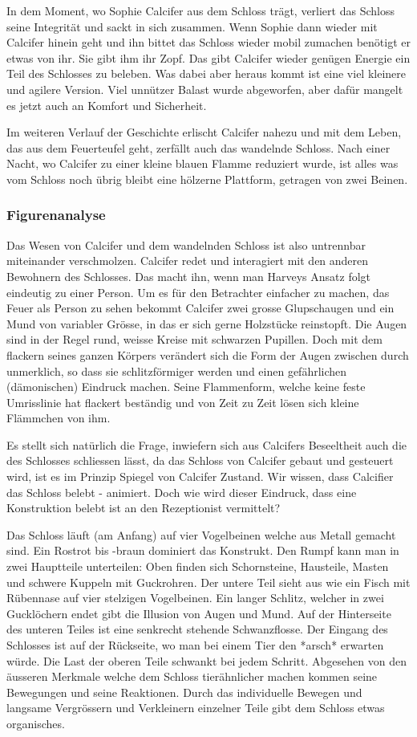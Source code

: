 In dem Moment, wo Sophie Calcifer aus dem Schloss trägt, verliert das Schloss seine Integrität und sackt in sich zusammen. Wenn Sophie dann wieder mit Calcifer hinein geht und ihn bittet das Schloss wieder mobil zumachen benötigt er etwas von ihr. Sie gibt ihm ihr Zopf. Das gibt Calcifer wieder genügen Energie ein Teil des Schlosses zu beleben. Was dabei aber heraus kommt ist eine viel kleinere und agilere Version. Viel unnützer Balast wurde abgeworfen, aber dafür mangelt es jetzt auch an Komfort und Sicherheit. 

Im weiteren Verlauf der Geschichte erlischt Calcifer nahezu und mit dem Leben, das aus dem Feuerteufel geht, zerfällt auch das wandelnde Schloss. Nach einer Nacht, wo Calcifer zu einer kleine blauen Flamme reduziert wurde, ist alles was vom Schloss noch übrig bleibt eine hölzerne Plattform, getragen von zwei Beinen. 

\subsubsection*{Figurenanalyse}
Das Wesen von Calcifer und dem wandelnden Schloss ist also untrennbar miteinander verschmolzen. Calcifer redet und interagiert mit den anderen Bewohnern des Schlosses. Das macht ihn, wenn man Harveys Ansatz folgt eindeutig zu einer Person. Um es für den Betrachter einfacher zu machen, das Feuer als Person zu sehen bekommt Calcifer zwei grosse Glupschaugen und ein Mund von variabler Grösse, in das er sich gerne Holzstücke reinstopft. Die Augen sind in der Regel rund, weisse Kreise mit schwarzen Pupillen. Doch mit dem flackern seines ganzen Körpers verändert sich die Form der Augen zwischen durch unmerklich, so dass sie schlitzförmiger werden und einen gefährlichen (dämonischen) Eindruck machen. Seine Flammenform, welche keine feste Umrisslinie hat flackert beständig und von Zeit zu Zeit lösen sich kleine Flämmchen von ihm. 

Es stellt sich natürlich die Frage, inwiefern sich aus Calcifers Beseeltheit auch die des Schlosses schliessen lässt, da das Schloss von Calcifer gebaut und gesteuert wird, ist es im Prinzip Spiegel von Calcifer Zustand. Wir wissen, dass Calcifier das Schloss belebt - animiert. Doch wie wird dieser Eindruck, dass eine Konstruktion belebt ist an den Rezeptionist vermittelt?

Das Schloss läuft (am Anfang) auf vier Vogelbeinen welche aus Metall gemacht sind. Ein Rostrot bis -braun dominiert das Konstrukt. Den Rumpf kann man in zwei Hauptteile unterteilen: Oben finden sich Schornsteine, Hausteile, Masten und schwere Kuppeln mit Guckrohren. Der untere Teil sieht aus wie ein Fisch mit Rübennase auf vier stelzigen Vogelbeinen. Ein langer Schlitz, welcher in zwei Gucklöchern endet gibt die Illusion von Augen und Mund. Auf der Hinterseite des unteren Teiles ist eine senkrecht stehende Schwanzflosse. Der Eingang des Schlosses ist auf der Rückseite, wo man bei einem Tier den *arsch* erwarten würde. Die Last der oberen Teile schwankt bei jedem Schritt.
Abgesehen von den äusseren Merkmale welche dem Schloss tierähnlicher machen kommen seine Bewegungen und seine Reaktionen. Durch das individuelle Bewegen und langsame Vergrössern und Verkleinern einzelner Teile gibt dem Schloss etwas organisches. 


